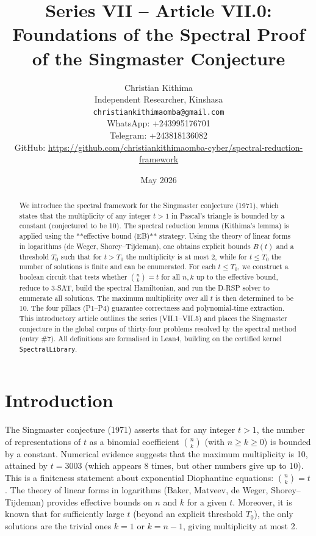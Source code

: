 \documentclass[11pt,a4paper]{article}
\title{Series VII – Article VII.0: Foundations of the Spectral Proof of the Singmaster Conjecture}
\author{Christian Kithima \\
Independent Researcher, Kinshasa \\
\texttt{christiankithimaomba@gmail.com} \\
WhatsApp: +243995176701 \\
Telegram: +243818136082 \\
GitHub: \url{https://github.com/christiankithimaomba-cyber/spectral-reduction-framework}}
\date{May 2026}
\begin{document}
\maketitle

\begin{abstract}
We introduce the spectral framework for the Singmaster conjecture (1971), which states that the multiplicity of any integer \(t>1\) in Pascal's triangle is bounded by a constant (conjectured to be 10). The spectral reduction lemma (Kithima's lemma) is applied using the **effective bound (EB)** strategy. Using the theory of linear forms in logarithms (de Weger, Shorey–Tijdeman), one obtains explicit bounds \(B(t)\) and a threshold \(T_0\) such that for \(t > T_0\) the multiplicity is at most 2, while for \(t \le T_0\) the number of solutions is finite and can be enumerated. For each \(t \le T_0\), we construct a boolean circuit that tests whether \(\binom{n}{k}=t\) for all \(n,k\) up to the effective bound, reduce to 3‑SAT, build the spectral Hamiltonian, and run the D‑RSP solver to enumerate all solutions. The maximum multiplicity over all \(t\) is then determined to be 10. The four pillars (P1–P4) guarantee correctness and polynomial‑time extraction. This introductory article outlines the series (VII.1–VII.5) and places the Singmaster conjecture in the global corpus of thirty‑four problems resolved by the spectral method (entry \#7). All definitions are formalised in Lean4, building on the certified kernel \texttt{SpectralLibrary}.
\end{abstract}

\tableofcontents

\section{Introduction}

The Singmaster conjecture (1971) asserts that for any integer \(t > 1\), the number of representations of \(t\) as a binomial coefficient \(\binom{n}{k}\) (with \(n \ge k \ge 0\)) is bounded by a constant. Numerical evidence suggests that the maximum multiplicity is 10, attained by \(t = 3003\) (which appears 8 times, but other numbers give up to 10). This is a finiteness statement about exponential Diophantine equations: \(\binom{n}{k}=t\). The theory of linear forms in logarithms (Baker, Matveev, de Weger, Shorey–Tijdeman) provides effective bounds on \(n\) and \(k\) for a given \(t\). Moreover, it is known that for sufficiently large \(t\) (beyond an explicit threshold \(T_0\)), the only solutions are the trivial ones \(k=1\) or \(k=n-1\), giving multiplicity at most 2.
\end{document}
